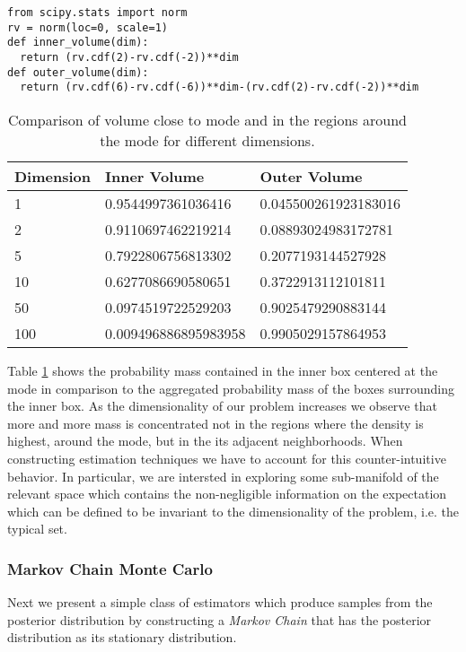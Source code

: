 \begin{lstlisting}
from scipy.stats import norm
rv = norm(loc=0, scale=1)
def inner_volume(dim):
  return (rv.cdf(2)-rv.cdf(-2))**dim
def outer_volume(dim):
  return (rv.cdf(6)-rv.cdf(-6))**dim-(rv.cdf(2)-rv.cdf(-2))**dim
\end{lstlisting}


\begin{table}
\centering
 \begin{tabular}{|l l l|}
 \hline
 Dimension & Inner Volume & Outer Volume \\ [0.5ex]
 \hline\hline
 1 & 0.9544997361036416 & 0.045500261923183016 \\
 2 & 0.9110697462219214 & 0.08893024983172781 \\
 5 & 0.7922806756813302 & 0.2077193144527928 \\
 10 & 0.6277086690580651 & 0.3722913112101811 \\
 50 & 0.0974519722529203 & 0.9025479290883144 \\
 100 & 0.009496886895983958 & 0.9905029157864953 \\ [1ex]
 \hline
 \end{tabular}
 \caption{Comparison of volume close to mode and in the regions around the mode for different dimensions.}
\label{tab:volume}
\end{table}

Table \ref{tab:volume} shows the probability mass contained in the inner box centered
at the mode in comparison to the aggregated probability mass of the boxes surrounding
the inner box. As the dimensionality of our problem increases we observe that more
and more mass is concentrated not in the regions where the density is highest, around the mode,
but in the its adjacent neighborhoods. When constructing estimation techniques we
have to account for this counter-intuitive behavior. In particular, we are intersted in
exploring some sub-manifold of the relevant space which contains the non-negligible
information on the expectation which can be defined to be invariant to the dimensionality of the problem, i.e. the typical set.

\subsubsection{Markov Chain Monte Carlo}
Next we present a simple class of estimators which produce samples from the posterior
distribution by constructing a \emph{Markov Chain} that has the posterior distribution
as its stationary distribution.

